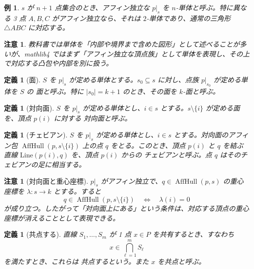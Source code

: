 \documentclass[a4paper,12pt]{bxjsbook}
\theoremstyle{theorem}
\newtheorem{definition}[theorem]{定義}
\newtheorem{example}[theorem]{例}
\newtheorem{remark}[theorem]{注意}
\DeclareMathOperator{\AffHull}{AffHull}
\begin{document}
    \begin{example}
        $s$ が $n+1$ 点集合のとき、アフィン独立な $p|_s$ を $n$-単体と呼ぶ。特に異なる 3 点 $A,B,C$ がアフィン独立なら、それは $2$-単体であり、通常の三角形 $\triangle ABC$ に対応する。
    \end{example}

    \begin{remark}
        教科書では単体を「内部や境界まで含めた図形」として述べることが多いが、mathlib4 ではまず「アフィン独立な頂点族」として単体を表現し、その上で対応する凸包や内部を別に扱う。
    \end{remark}

    \begin{definition}[面]
        $S$ を $p|_s$ が定める単体とする。$s_0\subseteq s$ に対し、点族 $p|_{s_0}$ が定める単体を $S$ の \emph{面}と呼ぶ。特に $|s_0|=k+1$ のとき、その面を \emph{$k$-面}と呼ぶ。
    \end{definition}

    \begin{definition}[対向面]
        $S$ を $p|_s$ が定める単体とし、$i\in s$ とする。$s\setminus\{i\}$ が定める面を、頂点 $p(i)$ に対する \emph{対向面}と呼ぶ。
    \end{definition}

    \begin{definition}[チェビアン]
        $S$ を $p|_s$ が定める単体とし、$i\in s$ とする。対向面のアフィン包 $\AffHull(p,s\setminus\{i\})$ 上の点 $q$ をとる。このとき、頂点 $p(i)$ と $q$ を結ぶ直線 $\mathrm{Line}(p(i),q)$ を、頂点 $p(i)$ からの \emph{チェビアン}と呼ぶ。点 $q$ はそのチェビアンの\emph{足}に相当する。
    \end{definition}

    \begin{remark}[対向面と重心座標]
        $p|_s$ がアフィン独立で、$q\in \AffHull(p,s)$ の重心座標を $\lambda:s\to k$ とする。すると
        \[
          q\in \AffHull(p,s\setminus\{i\})
          \quad\Longleftrightarrow\quad
          \lambda(i)=0
        \]
        が成り立つ。したがって「対向面上にある」という条件は、対応する頂点の重心座標が消えることとして表現できる。
    \end{remark}

    \begin{definition}[共点する]
        直線 $S_1,\dots,S_m$ が 1 点 $x\in P$ を共有するとき、すなわち
        \[
          x\in \bigcap_{\ell=1}^m S_\ell
        \]
        を満たすとき、これらは \emph{共点する}という。また $x$ を\emph{共点}と呼ぶ。
    \end{definition}
\end{document}
